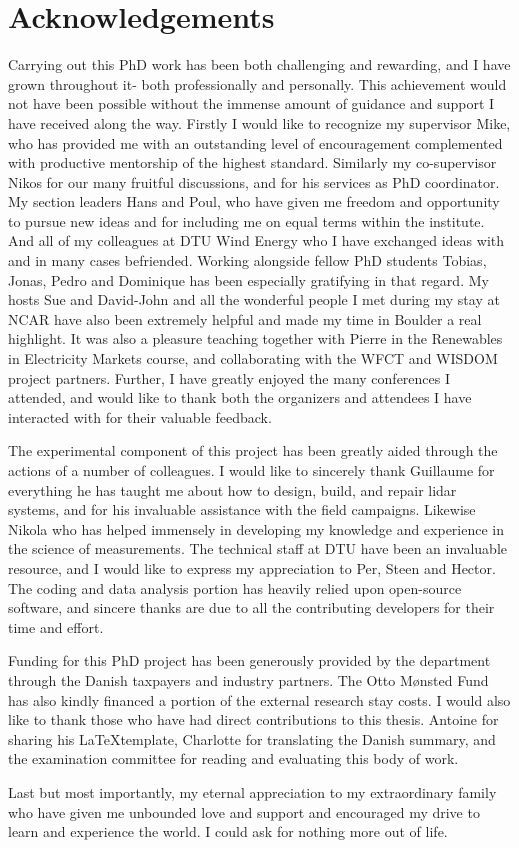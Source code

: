 \chapter{Acknowledgements}
\label{sec:acknowledgements}

Carrying out this PhD work has been both challenging and rewarding, and I have grown throughout it- both professionally and personally. This achievement would not have been possible without the immense amount of guidance and support I have received along the way. Firstly I would like to recognize my supervisor Mike, who has provided me with an outstanding level of encouragement complemented with productive mentorship of the highest standard. Similarly my co-supervisor Nikos for our many fruitful discussions, and for his services as PhD coordinator. My section leaders Hans and Poul, who have given me freedom and opportunity to pursue new ideas and for including me on equal terms within the institute. And all of my colleagues at DTU Wind Energy who I have exchanged ideas with and in many cases befriended. Working alongside fellow PhD students Tobias, Jonas, Pedro and Dominique has been especially gratifying in that regard. My hosts Sue and David-John and all the wonderful people I met during my stay at NCAR have also been extremely helpful and made my time in Boulder a real highlight. It was also a pleasure teaching together with Pierre in the Renewables in Electricity Markets course, and collaborating with the WFCT and WISDOM project partners. Further, I have greatly enjoyed the many conferences I attended, and would like to thank both the organizers and attendees I have interacted with for their valuable feedback.

The experimental component of this project has been greatly aided through the actions of a number of colleagues. I would like to sincerely thank Guillaume for everything he has taught me about how to design, build, and repair lidar systems, and for his invaluable assistance with the field campaigns. Likewise Nikola who has helped immensely in developing my knowledge and experience in the science of measurements. The technical staff at DTU have been an invaluable resource, and I would like to express my appreciation to Per, Steen and Hector. The coding and data analysis portion has heavily relied upon open-source software, and sincere thanks are due to all the contributing developers for their time and effort.

Funding for this PhD project has been generously provided by the department through the Danish taxpayers and industry partners. The Otto M{\o}nsted Fund has also kindly financed a portion of the external research stay costs. I would also like to thank those who have had direct contributions to this thesis. Antoine for sharing his \LaTeX template, Charlotte for translating the Danish summary, and the examination committee for reading and evaluating this body of work.

Last but most importantly, my eternal appreciation to my extraordinary family who have given me unbounded love and support and encouraged my drive to learn and experience the world. I could ask for nothing more out of life.

\begin{comment}
\end{comment}
